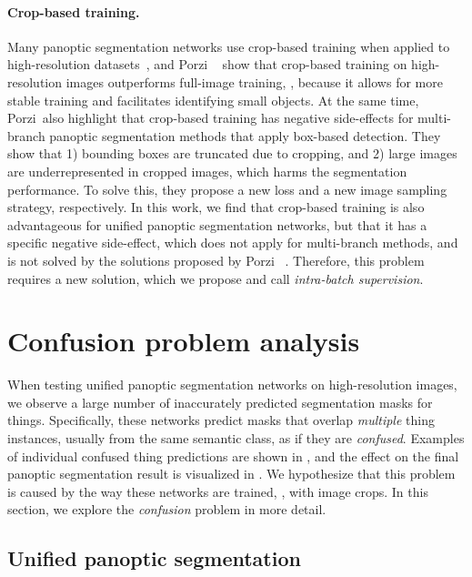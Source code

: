 \documentclass[10pt,twocolumn,letterpaper]{article}
\begin{document}
\paragraph{Crop-based training.}
Many panoptic segmentation networks use crop-based training when applied to high-resolution datasets~\cite{cheng2020pandeeplab,cheng2021mask2former,kirillov2019panopticfpn,li2021panopticfcn,mohan2020efficientps}, and Porzi \etal~\cite{porzi2021allscales} show that crop-based training on high-resolution images outperforms full-image training, \eg, because it allows for more stable training and facilitates identifying small objects. At the same time, Porzi~\etal also highlight that crop-based training has negative side-effects for multi-branch panoptic segmentation methods that apply box-based detection. They show that 1) bounding boxes are truncated due to cropping, and 2) large images are underrepresented in cropped images, which harms the segmentation performance. To solve this, they propose a new loss and a new image sampling strategy, respectively. 
In this work, we find that crop-based training is also advantageous for unified panoptic segmentation networks, but that it has a specific negative side-effect, which does not apply for multi-branch methods, and is not solved by the solutions proposed by Porzi \etal~\cite{porzi2021allscales}. Therefore, this problem requires a new solution, which we propose and call \textit{intra-batch supervision}. 








 \section{Confusion problem analysis}
\label{sec:problem_description}
When testing unified panoptic segmentation networks on high-resolution images, we observe a large number of inaccurately predicted segmentation masks for things. Specifically, these networks predict masks that overlap \textit{multiple} thing instances, usually from the same semantic class, as if they are \textit{confused}. Examples of individual confused thing predictions are shown in , and the effect on the final panoptic segmentation result is visualized in . We hypothesize that this problem is caused by the way these networks are trained, \ie, with image crops. In this section, we explore the \textit{confusion} problem in more detail.


\subsection{Unified panoptic segmentation}
\label{sec:problem_description:unified_networks}
\end{document}
